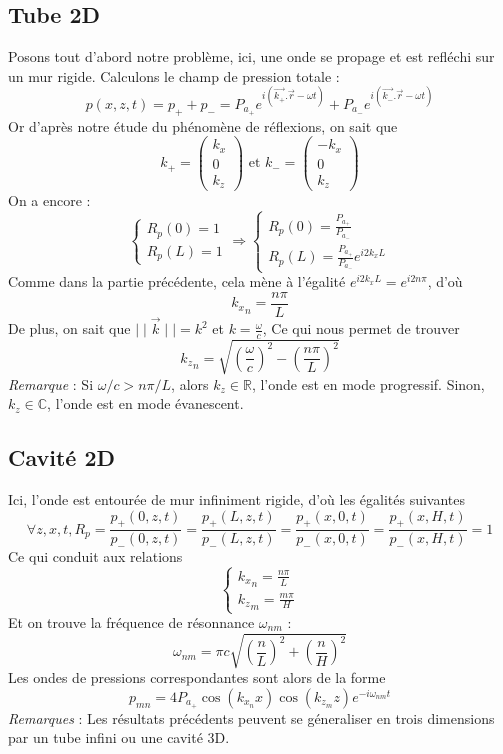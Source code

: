 \subsection{Tube 2D}
Posons tout d'abord notre problème, ici, une onde se propage et est refléchi sur un mur rigide. Calculons le champ de pression totale :
\[ p(x,z,t)=p_++p_-=P_{a_+}e^{i(\vec{k_+}.\vec{r}-\omega t)}+P_{a_-}e^{i(\vec{k_-}.\vec{r}-\omega t)} \]
Or d'après notre étude du phénomène de réflexions, on sait que
\[ 
k_+=\left(\begin{array}{l}k_x\\0\\k_z\end{array}\right)
\textrm{ et }
k_-=\left(\begin{array}{l}-k_x\\0\\k_z\end{array}\right)
\]
On a encore :
\[
\left\{
\begin{array}{l}
R_p(0)=1 \\
R_p(L)=1
\end{array}
\right.
\Rightarrow
\left\{
\begin{array}{l}
R_p(0)=\frac{P_{a_+}}{P_{a_-}} \\
R_p(L)=\frac{P_{a_+}}{P_{a_-}}e^{i2k_xL}
\end{array}
\right.
\]
Comme dans la partie précédente, cela mène à l'égalité $e^{i2k_xL}=e^{i2n\pi}$, d'où
\[ {k_x}_n=\frac{n\pi}{L} \]
De plus, on sait que $\mid\mid\vec{k}\mid\mid=k^2$ et $k=\frac{\omega}{c}$, Ce qui nous permet de trouver
\[ {k_z}_n=\sqrt{\left(\frac{\omega}{c}\right)^2-\left(\frac{n\pi}{L}\right)^2} \]
\emph{Remarque} : Si $\omega/c>n\pi/L$, alors  $k_z\in\mathbb{R}$, l'onde est en mode progressif. Sinon, $k_z\in\mathbb{C}$, l'onde est en mode évanescent.

\subsection{Cavité 2D}
Ici, l'onde est entourée de mur infiniment rigide, d'où les égalités suivantes
\[ \forall z,x,t, R_p=\frac{p_+(0,z,t)}{p_-(0,z,t)}=\frac{p_+(L,z,t)}{p_-(L,z,t)}=\frac{p_+(x,0,t)}{p_-(x,0,t)}=\frac{p_+(x,H,t)}{p_-(x,H,t)}=1 \]
Ce qui conduit aux relations
\[
\left\{
\begin{array}{l}
{k_x}_n=\frac{n\pi}{L} \\
{k_z}_m=\frac{m\pi}{H}
\end{array}
\right.
\]
Et on trouve la fréquence de résonnance $\omega_{nm}$ :
\[ \omega_{nm}=\pi c\sqrt{\left(\frac{n}{L}\right)^2+\left(\frac{n}{H}\right)^2} \]
Les ondes de pressions correspondantes sont alors de la forme
\[ p_{mn}=4P_{a_+}\cos(k_{x_n}x)\cos(k_{z_m}z)e^{-i\omega_{nm}t} \]
\emph{Remarques} : Les résultats précédents peuvent se géneraliser en trois dimensions par un tube infini ou une cavité 3D.

